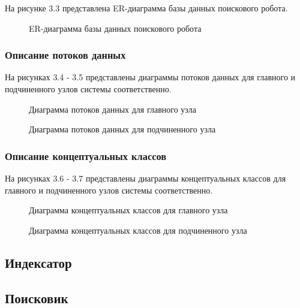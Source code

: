 На рисунке 3.3 представлена ER-диаграмма базы данных поискового робота.

\begin{figure}
\caption{ER-диаграмма базы данных поискового робота}
\label{robot/robot_db:image}
\end{figure}

\subsubsection{Описание потоков данных}

На рисунках 3.4 - 3.5 представлены диаграммы потоков данных для главного и подчиненного узлов системы соответственно.

\begin{figure}
\caption{Диаграмма потоков данных для главного узла}
\label{robot/diagram_dataflow_master:image}
\end{figure}

\begin{figure}
\caption{Диаграмма потоков данных для подчиненного узла}
\label{robot/diagram_dataflow_slave:image}
\end{figure}

\subsubsection{Описание концептуальных классов}

На рисунках 3.6 - 3.7 представлены диаграммы концептуальных классов для главного и подчиненного узлов системы соответственно.

\begin{figure}
\caption{Диаграмма концептуальных классов для главного узла}
\label{robot/diagram_master_classes:image}
\end{figure}

\begin{figure}
\caption{Диаграмма концептуальных классов для подчиненного узла}
\label{robot/diagram_slave_classe:image}
\end{figure}

\subsection{Индексатор}
\subsection{Поисковик}